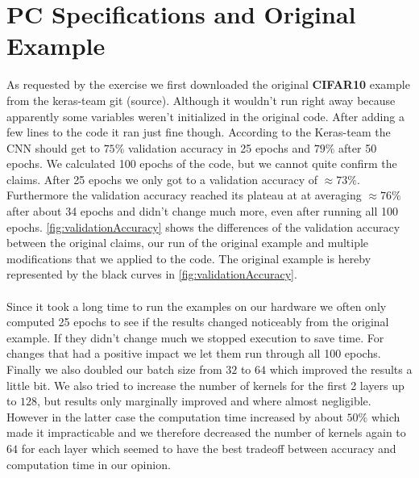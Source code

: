 \documentclass{article}
\begin{document}
	\section{PC Specifications and Original Example}
	\label{sec:PCSpecificationsAndOriginalExample}
	As requested by the exercise we first downloaded the original \textbf{CIFAR10} example from the keras-team git (source). Although it wouldn't run right away because apparently some variables weren't initialized in the original code. After adding a few lines to the code it ran just fine though. According to the Keras-team the CNN should get to $75\%$ validation accuracy in 25 epochs and $79\%$ after 50 epochs. We calculated 100 epochs of the code, but we cannot quite confirm the claims. After 25 epochs we only got to a validation accuracy of $\approx73\%$. Furthermore the validation accuracy reached its plateau at at averaging $\approx76\%$ after about 34 epochs and didn't change much more, even after running all 100 epochs. \autoref{fig:validationAccuracy} shows the differences of the validation accuracy between the original claims, our run of the original example and multiple modifications that we applied to the code. The original example is hereby represented by the black curves in \autoref{fig:validationAccuracy}. \\
	\\
	Since it took a long time to run the examples on our hardware we often only computed 25 epochs to see if the results changed noticeably from the original example. If they didn't change much we stopped execution to save time. For changes that had a positive impact we let them run through all 100 epochs. 
	Finally we also doubled our batch size from $32$ to $64$ which improved the results a little bit. We also tried to increase the number of kernels for the first 2 layers up to $128$, but results only marginally improved and where almost negligible. However in the latter case the computation time increased by about $50\%$ which made it impracticable and we therefore decreased the number of kernels again to $64$ for each layer which seemed to have the best tradeoff between accuracy and computation time in our opinion. 
	
\end{document}

